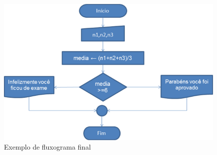 \begin{figure}[htp!]
\centering
\includegraphics[width=\textwidth]{figuras/fluxograma1.jpg}
\caption{Exemplo de fluxograma final}
\label{figura2}
\end{figure}











